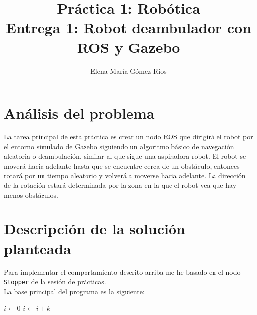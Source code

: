 \documentclass[11pt]{article}
\title{Práctica	1: Robótica \\
Entrega	1: Robot deambulador con ROS y Gazebo}
\author{ Elena María Gómez Ríos }
\begin{document}
\maketitle

\section{Análisis del problema}
La tarea principal de esta práctica es crear un nodo ROS que dirigirá el robot por el entorno simulado de Gazebo siguiendo un algoritmo básico de navegación aleatoria o deambulación, similar al que sigue una aspiradora robot. El robot se moverá hacia adelante hasta que se encuentre cerca de un obstáculo, entonces rotará por un tiempo aleatorio y volverá a moverse hacia adelante. La dirección de la rotación estará determinada por la zona en la que el robot vea que hay menos obstáculos.

\section{Descripción de la solución planteada}
Para implementar el comportamiento descrito arriba me he basado en el nodo \texttt{Stopper} de la sesión de prácticas.\\

La base principal del programa es la siguiente:


\begin{algorithmic}
    \State $i\gets 0$
        \State $i\gets i+k$
\EndIf
\end{algorithmic}
\end{document}
